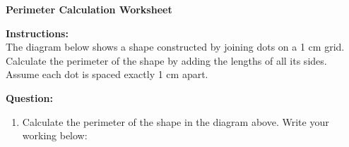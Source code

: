 \documentclass[12pt]{article}
\begin{document}
\begin{center}
    \Large \textbf{Perimeter Calculation Worksheet}
\end{center}

\vspace{10pt}
\noindent \textbf{Instructions:} \\
The diagram below shows a shape constructed by joining dots on a 1 cm grid. Calculate the perimeter of the shape by adding the lengths of all its sides. Assume each dot is spaced exactly 1 cm apart.

\vspace{10pt}

\begin{center}
\end{center}

\vspace{10pt}

\noindent \textbf{Question:}
\begin{enumerate}
    \item Calculate the perimeter of the shape in the diagram above. Write your working below:
    \vspace{6cm}  %
\end{enumerate}

\vfill
\end{document}
